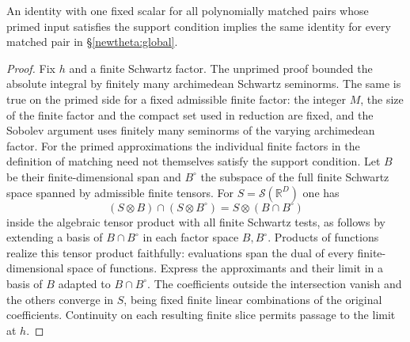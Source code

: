 \begin{corollary}\label{threal:limits}
An identity with one fixed scalar for all polynomially matched pairs
whose primed input satisfies the support condition implies the same
identity for every matched pair in \S\ref{newtheta:global}.
\end{corollary}
\begin{proof}
Fix \(h\) and a finite Schwartz factor. The unprimed proof bounded the
absolute integral by finitely many archimedean Schwartz seminorms.
The same is true on the primed side for a fixed admissible finite
factor: the integer \(M\), the size of the finite factor and the
compact set used in reduction are fixed, and the Sobolev argument
uses finitely many seminorms of the varying archimedean factor.
For the primed approximations the individual finite factors in the
definition of matching need not themselves satisfy the support
condition. Let \(B\) be their finite-dimensional span and \(B^\circ\)
the subspace of the full finite Schwartz space spanned by admissible
finite tensors. For \(S=\mathcal S(\mathbb R^D)\) one has
\[
      (S\otimes B)\cap(S\otimes B^\circ)=S\otimes(B\cap B^\circ)
\]
inside the algebraic tensor product with all finite Schwartz tests,
as follows by extending a basis of \(B\cap B^\circ\) in each factor
space \(B,B^\circ\). Products of functions realize this tensor product
faithfully: evaluations span the dual of every finite-dimensional
space of functions. Express the approximants and their limit in a
basis of \(B\) adapted to \(B\cap B^\circ\). The coefficients outside
the intersection vanish and the others converge in \(S\), being fixed
finite linear combinations of the original coefficients. Continuity
on each resulting finite slice permits passage to the limit at \(h\).
\end{proof}

